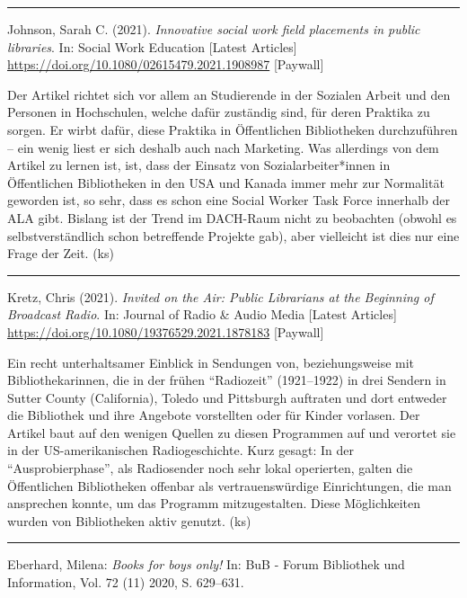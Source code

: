 \documentclass[a4paper,
fontsize=11pt,
oneside,
numbers=noperiodatend,
parskip=half-,
bibliography=totoc,
final
]{scrartcl}
\begin{document}
\begin{center}\rule{0.5\linewidth}{0.5pt}\end{center}

Johnson, Sarah C. (2021). \emph{Innovative social work field placements
in public libraries}. In: Social Work Education {[}Latest Articles{]}
\url{https://doi.org/10.1080/02615479.2021.1908987} {[}Paywall{]}

Der Artikel richtet sich vor allem an Studierende in der Sozialen Arbeit und
den Personen in Hochschulen, welche dafür zuständig sind, für deren
Praktika zu sorgen. Er wirbt dafür, diese Praktika in Öffentlichen
Bibliotheken durchzuführen -- ein wenig liest er sich deshalb auch nach
Marketing. Was allerdings von dem Artikel zu lernen ist, ist, dass der
Einsatz von Sozialarbeiter*innen in Öffentlichen Bibliotheken in den USA
und Kanada immer mehr zur Normalität geworden ist, so sehr, dass es
schon eine Social Worker Task Force innerhalb der ALA gibt. Bislang ist
der Trend im DACH-Raum nicht zu beobachten (obwohl es selbstverständlich
schon betreffende Projekte gab), aber vielleicht ist dies nur eine Frage
der Zeit. (ks)

\begin{center}\rule{0.5\linewidth}{0.5pt}\end{center}

Kretz, Chris (2021). \emph{Invited on the Air: Public Librarians at the
Beginning of Broadcast Radio}. In: Journal of Radio \& Audio Media
{[}Latest Articles{]}
\url{https://doi.org/10.1080/19376529.2021.1878183} {[}Paywall{]}

Ein recht unterhaltsamer Einblick in Sendungen von, beziehungsweise mit
Bibliothekarinnen, die in der frühen \enquote{Radiozeit} (1921--1922) in drei
Sendern in Sutter County (California), Toledo und Pittsburgh auftraten
und dort entweder die Bibliothek und ihre Angebote vorstellten oder für
Kinder vorlasen. Der Artikel baut auf den wenigen Quellen zu diesen
Programmen auf und verortet sie in der US-amerikanischen
Radiogeschichte. Kurz gesagt: In der \enquote{Ausprobierphase}, als
Radiosender noch sehr lokal operierten, galten die Öffentlichen
Bibliotheken offenbar als vertrauenswürdige Einrichtungen, die man
ansprechen konnte, um das Programm mitzugestalten. Diese Möglichkeiten
wurden von Bibliotheken aktiv genutzt. (ks)

\begin{center}\rule{0.5\linewidth}{0.5pt}\end{center}

Eberhard, Milena: \emph{Books for boys only!} In: BuB - Forum Bibliothek
und Information, Vol. 72 (11) 2020, S. 629--631.
\end{document}
